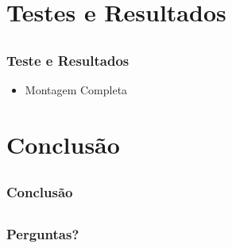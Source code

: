 \documentclass{beamer}
\begin{document}
\section{Testes e Resultados}
\subsection{}
\begin{frame}
 \frametitle{Teste e Resultados}

  \begin{itemize}
   \item Montagem Completa
  \end{itemize}

\end{frame}

\section{Conclusão}
\subsection{}
\begin{frame}
 \frametitle{Conclusão}

  
\end{frame}

\subsection{}
\begin{frame}
 \frametitle{Perguntas?}
\end{frame}
\end{document}
